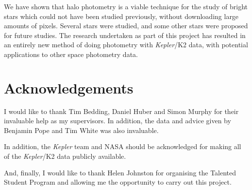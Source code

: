 \documentclass{book}
\begin{document}
We have shown that halo photometry is a viable technique for the study of bright
stars which could not have been studied previously, without downloading large
amounts of pixels. Several stars were studied, and some other stars were proposed
for future studies. The research undertaken as part of this project has resulted
in an entirely new method of doing photometry with \textit{Kepler}/K2 data, with
potential applications to other space photometry data.

\section{Acknowledgements}

I would like to thank Tim Bedding, Daniel Huber and Simon Murphy for their
invaluable help as my supervisors. In addition, the data and advice given by
Benjamin Pope and Tim White was also invaluable.

In addition, the \textit{Kepler} team and NASA should be acknowledged for
making all of the \textit{Kepler}/K2 data publicly available.

And, finally, I would like to thank Helen Johnston for organising the Talented
Student Program and allowing me the opportunity to carry out this project.

\let\cleardoublepage\clearpage

{\footnotesize

\renewcommand\bibname{\Large References}
}
\end{document}
